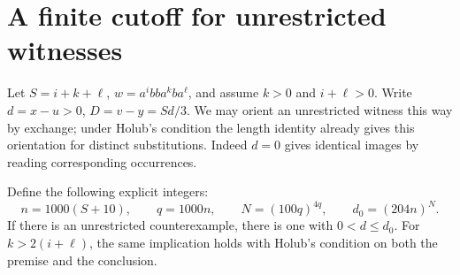 \section{A finite cutoff for unrestricted witnesses}
Let $S=i+k+\ell$, $w=a^ibb a^kb a^\ell$, and assume $k>0$ and
$i+\ell>0$. Write $d=x-u>0$, $D=v-y=Sd/3$. We may orient an
unrestricted witness this way by exchange; under Holub's condition the
length identity already gives this orientation for distinct substitutions.
Indeed $d=0$ gives identical images by reading corresponding occurrences.

\begin{theorem}
Define the following explicit integers:
\[
 n=1000(S+10),\qquad q=1000n,\qquad
 N=(100q)^{4q},\qquad d_0=(204n)^N .
\]
If there is an unrestricted counterexample, there is one with
$0<d\le d_0$. For $k>2(i+\ell)$, the same implication
holds with Holub's condition on both the premise and the conclusion.
\end{theorem}

